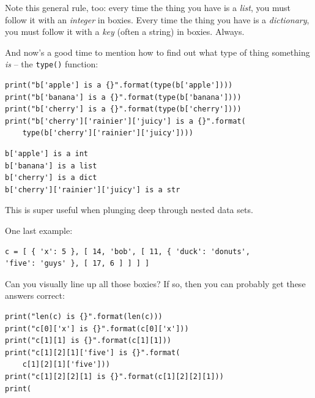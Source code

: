 
Note this general rule, too: every time the thing you have is a \textit{list},
you must follow it with an \textit{integer} in boxies. Every time the thing you
have is a \textit{dictionary}, you must follow it with a \textit{key} (often a
string) in boxies. Always.

And now's a good time to mention how to find out what type of thing something
\textit{is} -- the \texttt{type()} function:

\begin{Verbatim}[fontsize=\small,samepage=true,frame=single,framesep=3mm]
print("b['apple'] is a {}".format(type(b['apple'])))
print("b['banana'] is a {}".format(type(b['banana'])))
print("b['cherry'] is a {}".format(type(b['cherry'])))
print("b['cherry']['rainier']['juicy'] is a {}".format(
    type(b['cherry']['rainier']['juicy'])))
\end{Verbatim}
\vspace{-.2in}

\begin{Verbatim}[fontsize=\small,samepage=true,frame=leftline,framesep=5mm,framerule=1mm]
b['apple'] is a int
b['banana'] is a list
b['cherry'] is a dict
b['cherry']['rainier']['juicy'] is a str
\end{Verbatim}

This is super useful when plunging deep through nested data sets.

One last example:


\begin{Verbatim}[fontsize=\small,samepage=true,frame=single,framesep=3mm]
c = [ { 'x': 5 }, [ 14, 'bob', [ 11, { 'duck': 'donuts',
'five': 'guys' }, [ 17, 6 ] ] ] ]
\end{Verbatim}


Can you visually line up all those boxies? If so, then you can probably get
these answers correct:

\begin{Verbatim}[fontsize=\small,samepage=true,frame=single,framesep=3mm]
print("len(c) is {}".format(len(c)))
print("c[0]['x'] is {}".format(c[0]['x']))
print("c[1][1] is {}".format(c[1][1]))
print("c[1][2][1]['five'] is {}".format(
    c[1][2][1]['five']))
print("c[1][2][2][1] is {}".format(c[1][2][2][1]))
print(\end{Verbatim}
\vspace{-.2in}

